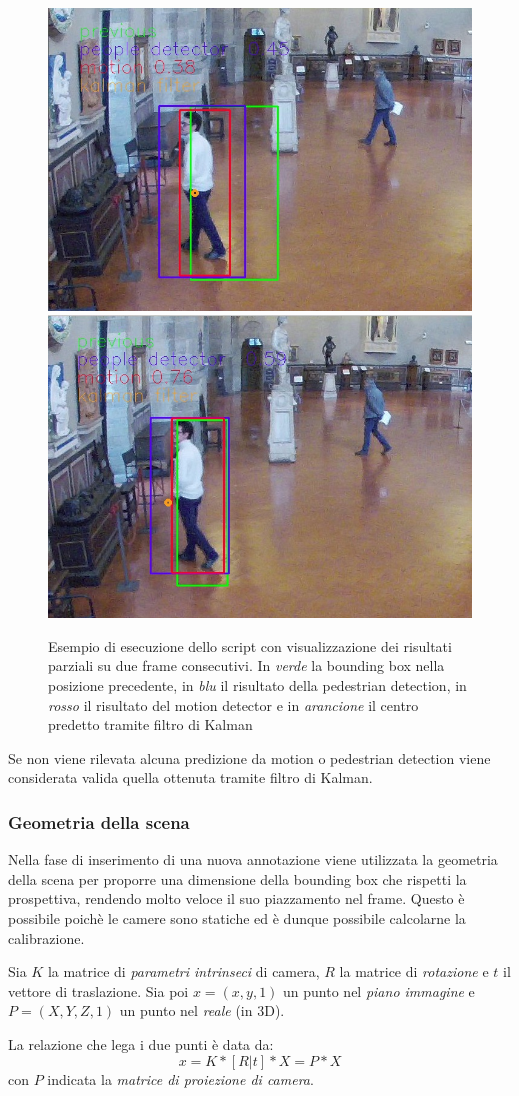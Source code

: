 \begin{figure}[h]
\centering
\includegraphics[width=.4\textwidth]{images/prediction1.jpg}\quad
\medskip
\includegraphics[width=.4\textwidth]{images/prediction2.jpg}\quad
\caption{Esempio di esecuzione dello script con visualizzazione dei risultati parziali su due frame consecutivi. In \emph{verde} la bounding box nella posizione precedente, in \emph{blu} il risultato della pedestrian detection, in \emph{rosso} il risultato del motion detector e in \emph{arancione} il centro predetto tramite filtro di Kalman}
\label{fig:prediction}
\end{figure}

Se non viene rilevata alcuna predizione da motion o pedestrian detection viene considerata valida quella ottenuta tramite filtro di Kalman.


\subsubsection{Geometria della scena}

Nella fase di inserimento di una nuova annotazione viene utilizzata la geometria della scena per proporre una dimensione della bounding box che rispetti la prospettiva, rendendo molto veloce il suo piazzamento nel frame.
Questo è possibile poichè le camere sono statiche ed è dunque possibile calcolarne la calibrazione\cite{Bimbo:2010:EDV:1801040.1801847}. 

Sia $K$ la matrice di \emph{parametri intrinseci} di camera, $R$ la matrice di \emph{rotazione} e $t$ il vettore di traslazione. Sia poi $x = (x, y, 1)$ un punto nel \emph{piano immagine} e $P = (X, Y, Z, 1)$ un punto nel \emph{reale} (in 3D). 

La relazione che lega i due punti è data da:
\begin{equation}
x = K*[R|t]* X = P * X
\end{equation}
con $P$ indicata la \emph{matrice di proiezione di camera}. 


